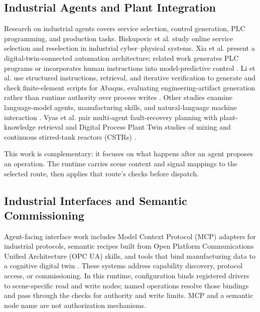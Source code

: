 \subsection{Industrial Agents and Plant Integration}
Research on industrial agents covers service selection, control generation, PLC programming, and production tasks. Biskupovic et al. study online service selection and reselection in industrial cyber--physical systems. Xia et al. present a digital-twin-connected automation architecture; related work generates PLC programs or incorporates human instructions into model-predictive control \cite{biskupovic2025supervision,xia2025architecture,xia2025control,liu2026agents4plc,wu2025instructmpc}. Li et al. use structured instructions, retrieval, and iterative verification to generate and check finite-element scripts for Abaqus, evaluating engineering-artifact generation rather than runtime authority over process writes \cite{li2026modsolagent}. Other studies examine language-model agents, manufacturing skills, and natural-language machine interaction \cite{koehle2026llmdriven,lim2025llmenabled,zhao2026shopfloor,hofmann2025nlc,huang2026made}. Vyas et al. pair multi-agent fault-recovery planning with plant-knowledge retrieval and Digital Process Plant Twin studies of mixing and continuous stirred-tank reactors (CSTRs) \cite{vyas2026detection}.

This work is complementary: it focuses on what happens after an agent proposes an operation. The runtime carries scene context and signal mappings to the selected route, then applies that route's checks before dispatch.

\subsection{Industrial Interfaces and Semantic Commissioning}
Agent-facing interface work includes Model Context Protocol (MCP) adapters for industrial protocols, semantic recipes built from Open Platform Communications Unified Architecture (OPC UA) skills, and tools that bind manufacturing data to a cognitive digital twin \cite{silva2025mcpmanufacturing,koehle2025semanticrecipes,xavier2026industriConnect,liu2026semanticcommissioning}. These systems address capability discovery, protocol access, or commissioning. In this runtime, configuration binds registered drivers to scene-specific read and write nodes; named operations resolve those bindings and pass through the checks for authority and write limits. MCP and a semantic node name are not authorization mechanisms.

